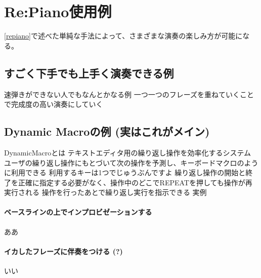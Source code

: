 \section{Re:Piano使用例}

\ref{repiano}で述べた単純な手法によって、さまざまな演奏の楽しみ方が可能になる。

\subsection{すごく下手でも上手く演奏できる例}
速弾きができない人でもなんとかなる例
一つ一つのフレーズを重ねていくことで完成度の高い演奏にしていく


\subsection{Dynamic Macroの例 (実はこれがメイン)}
DynamicMacro\cite{Masui}とは
テキストエディタ用の繰り返し操作を効率化するシステム
ユーザの繰り返し操作にもとづいて次の操作を予測し、キーボードマクロのように利用できる
利用するキーは1つでじゅうぶんですよ
繰り返し操作の開始と終了を正確に指定する必要がなく、操作中のどこでREPEATを押しても操作が再実行される
操作を行ったあとで繰り返し実行を指示できる
実例
\paragraph*{ベースラインの上でインプロビゼーションする}
ああ
\paragraph*{イカしたフレーズに伴奏をつける (?)}
いい
